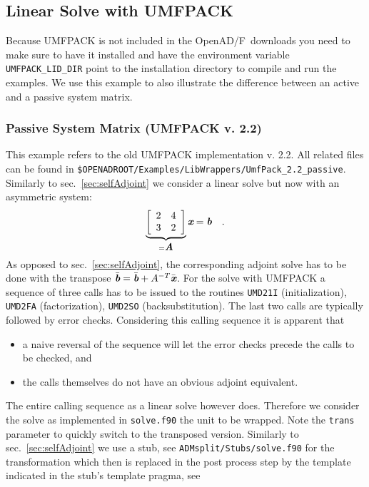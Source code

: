 \documentclass{book}
\newcommand{\OpenADF}{OpenAD/F}
\newcommand{\bmA}{\mbox{\bf\em A}}
\newcommand{\bmb}{\mbox{\bf\em b}}
\newcommand{\bmx}{\mbox{\bf\em x}}
\newcommand{\refsec}[1]{{sec.~\ref{#1}}}
\begin{document}
\subsection{Linear Solve with UMFPACK}\label{sec:umfpack}
Because UMFPACK \cite{umfpackWeb} is not included in the \OpenADF\ downloads you need to make sure to have it installed and have the environment variable \lstinline{UMFPACK_LID_DIR} point to the installation directory to compile and run the examples. 
We use this example to also illustrate the difference between an active and a passive system matrix. 
\subsubsection{Passive System Matrix (UMFPACK v. 2.2)}\label{sec:umfpackPassive}  
This example refers to the old UMFPACK implementation v. 2.2.  
All related files can be found in 
\lstinline{$OPENADROOT/Examples/LibWrappers/UmfPack_2.2_passive}. %
Similarly to \refsec{sec:selfAdjoint} we consider a linear solve but now with an asymmetric system: 
\[
\underbrace{\left[\begin{array}{cc}
2 & 4 \\
3 & 2 
\end{array}\right]}_{=\bmA} \bmx=\bmb \quad .
\]
As opposed to \refsec{sec:selfAdjoint}, the corresponding adjoint solve has to be done with the transpose
$\bar{\bmb}=\bar{\bmb}+A^{-T}\bar{\bmx}$.
For the solve with UMFPACK a sequence of three calls has to be issued to the routines
\lstinline{UMD21I} (initialization),  \lstinline{UMD2FA} (factorization), \lstinline{UMD2SO} (backsubstitution).
The last two calls are typically followed by error checks. Considering this calling sequence it is apparent that 
\begin{itemize} 
\item a naive reversal of the sequence will let the error checks precede the calls to be checked, and 
\item the calls themselves do not have an obvious adjoint equivalent.
\end{itemize}
The entire calling sequence as a linear solve however does.  Therefore we consider the solve as implemented in 
\lstinline{solve.f90} the unit to be wrapped. Note the \lstinline{trans} parameter to quickly switch to the 
transposed version.
Similarly to \refsec{sec:selfAdjoint} we use a stub, see \lstinline{ADMsplit/Stubs/solve.f90} for the transformation
which then is replaced in the post process step by the template indicated in the stub's template pragma, see 
\end{document}

